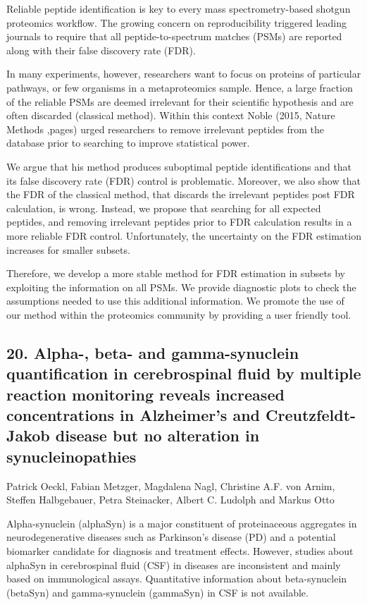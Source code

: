 Reliable peptide identification is key to every mass spectrometry-based shotgun proteomics workflow.
The growing concern on reproducibility triggered leading journals to require that all peptide-to-spectrum matches (PSMs) are reported along with their false discovery rate (FDR).

In many experiments, however, researchers want to focus on proteins of particular pathways, or few organisms in a metaproteomics sample.
Hence, a large fraction of the reliable PSMs are deemed irrelevant for their scientific hypothesis and are often discarded (classical method).
Within this context Noble (2015, Nature Methods ,pages) urged researchers to remove irrelevant peptides from the database prior to searching to improve statistical power.

We argue that his method produces suboptimal peptide identifications and that its false discovery rate (FDR) control is problematic.
Moreover, we also show that the FDR of the classical method, that discards the irrelevant peptides post FDR calculation, is wrong.
Instead, we propose that searching for all expected peptides, and removing irrelevant peptides prior to FDR calculation results in a more reliable FDR control.
Unfortunately, the uncertainty on the FDR estimation increases for smaller subsets.

Therefore, we develop a more stable method for FDR estimation in subsets by exploiting the information on all PSMs.
We provide diagnostic plots to check the assumptions needed to use this additional information.
We promote the use of our method within the proteomics community by providing a user friendly tool.

\subsection*{\color{eubicRed} 20. Alpha-, beta- and gamma-synuclein quantification in cerebrospinal fluid by multiple reaction monitoring reveals increased concentrations in Alzheimer's and Creutzfeldt-Jakob disease but no alteration in synucleinopathies}
{\color{eubicGray}Patrick Oeckl, Fabian Metzger, Magdalena Nagl, Christine A.F. von Arnim, Steffen Halbgebauer, Petra Steinacker, Albert C. Ludolph and Markus Otto}

Alpha-synuclein (alphaSyn) is a major constituent of proteinaceous aggregates in neurodegenerative diseases such as Parkinson's disease (PD) and a potential biomarker candidate for diagnosis and treatment effects. However, studies about alphaSyn in cerebrospinal fluid (CSF) in diseases are inconsistent and mainly based on immunological assays. Quantitative information about beta-synuclein (betaSyn) and gamma-synuclein (gammaSyn) in CSF is not available.

